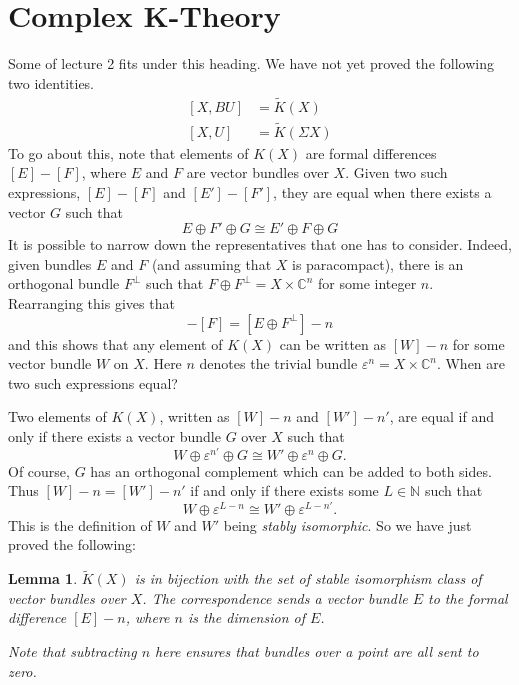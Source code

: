 \documentclass[a4paper,10pt]{article}
\theoremstyle{plain}%
\newtheorem{lem}[thm]{Lemma}
\theoremstyle{definition}
\theoremstyle{remark}
\newcommand{\NN}{\mathbb{N}}
\newcommand{\CC}{\mathbb{C}}
\renewcommand{\epsilon}{\varepsilon}
\newcommand{\eps}{\epsilon}
\begin{document}
\section{Complex K-Theory}

Some of lecture 2 fits under this heading.
We have not yet proved the following two identities.
\begin{align}
  \label{xbu-is-kx} [X, BU] &= \tilde{K}(X)\\
  \label{xu-is-ksx}[X, U] &= \tilde{K}(\Sigma X)
\end{align}
To go about this, note that elements of $K(X)$ are formal differences
$[E]-[F]$, where $E$ and $F$ are vector bundles over $X$. Given two
such expressions, $[E]-[F]$ and $[E']-[F']$, they are equal when there
exists a vector $G$ such that
\begin{equation*}
  E\oplus F' \oplus G \cong E' \oplus F \oplus G
\end{equation*}
It is possible to narrow down the representatives that one has to
consider. Indeed, given bundles $E$ and $F$ (and assuming that $X$ is
paracompact), there is an orthogonal bundle $F^\perp$ such that
$F\oplus F^\perp = X \times \CC^n$ for some integer $n$. Rearranging
this gives that
\begin{equation*}
  [E]-[F] = [E\oplus F^\perp] - n
\end{equation*}
and this shows that any element of $K(X)$ can be written as $[W]-n$
for some vector bundle $W$ on $X$. Here $n$ denotes the trivial bundle
$\eps^n = X\times \CC^n$. When are two such expressions equal?

Two elements of $K(X)$, written as $[W]-n$ and $[W']-n'$, are equal if
and only if there exists a vector bundle $G$ over $X$ such that
\begin{equation*}
  W \oplus \eps^{n'} \oplus G \cong W' \oplus \eps^n \oplus G.
\end{equation*}
Of course, $G$ has an orthogonal complement which can be added to both
sides. Thus $[W]-n = [W']-n'$ if and only if there exists some $L\in
\NN$ such that
\begin{equation*}
  W \oplus \epsilon^{L-n} \cong W' \oplus \epsilon^{L-n'}.
\end{equation*}
This is the definition of $W$ and $W'$ being \emph{stably
  isomorphic}. So we have just proved the following:
\begin{lem}\label{kx-stableisos}
  $\tilde{K}(X)$ is in bijection with the set of stable isomorphism
  class of vector bundles over $X$. The correspondence sends a vector
  bundle $E$ to the formal difference $[E]-n$, where $n$ is the
  dimension of $E$.

  Note that subtracting $n$ here ensures that bundles over a point are
  all sent to zero.
\end{lem}
\end{document}
